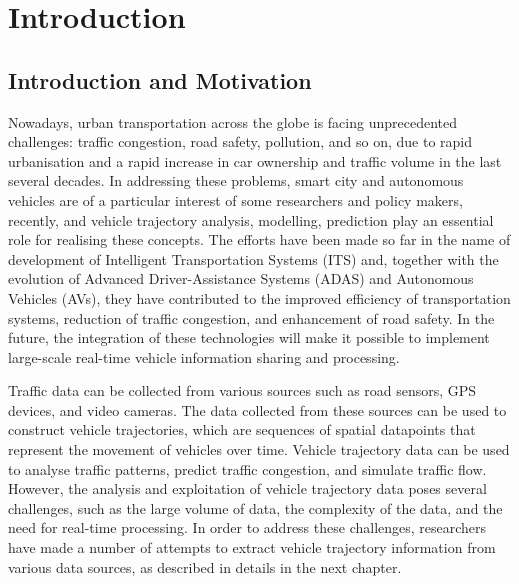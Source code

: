 \documentclass[11pt]{uonthesis}
\begin{document}
\chapter{Introduction}

\section{Introduction and Motivation}
Nowadays, urban transportation across the globe is facing unprecedented challenges: traffic congestion, road safety, pollution, and so on, due to rapid urbanisation and a rapid increase in car ownership and traffic volume in the last several decades. In addressing these problems, smart city and autonomous vehicles are of a particular interest of some researchers and policy makers, recently, and vehicle trajectory analysis, modelling, prediction play an essential role for realising these concepts. The efforts have been made so far in the name of development of Intelligent Transportation Systems (ITS) and, together with the evolution of Advanced Driver-Assistance Systems (ADAS) and Autonomous Vehicles (AVs), they have contributed to the improved efficiency of transportation systems, reduction of traffic congestion, and enhancement of road safety. In the future, the integration of these technologies will make it possible to implement large-scale real-time vehicle information sharing and processing. 

Traffic data can be collected from various sources such as road sensors, GPS devices, and video cameras. The data collected from these sources can be used to construct vehicle trajectories, which are sequences of spatial datapoints that represent the movement of vehicles over time. Vehicle trajectory data can be used to analyse traffic patterns, predict traffic congestion, and simulate traffic flow. However, the analysis and exploitation of vehicle trajectory data poses several challenges, such as the large volume of data, the complexity of the data, and the need for real-time processing. In order to address these challenges, researchers have made a number of attempts to extract vehicle trajectory information from various data sources, as described in details in the next chapter.
\end{document}
